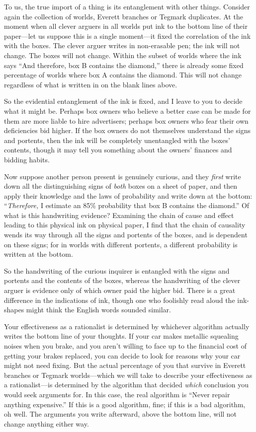 {
 To us, the true import of a thing is its entanglement with other
things. Consider again the collection of worlds, Everett branches or
Tegmark duplicates. At the moment when all clever arguers in all worlds
put ink to the bottom line of their paper---let us suppose this is a
single moment---it fixed the correlation of the ink with the boxes. The
clever arguer writes in non-erasable pen; the ink will not change. The
boxes will not change. Within the subset of worlds where the ink says
``And therefore, box B contains the
diamond,'' there is already some fixed percentage of
worlds where box A contains the diamond. This will not change
regardless of what is written in on the blank lines above.}

{
 So the evidential entanglement of the ink is fixed, and I leave to
you to decide what it might be. Perhaps box owners who believe a better
case can be made for them are more liable to hire advertisers; perhaps
box owners who fear their own deficiencies bid higher. If the box
owners do not themselves understand the signs and portents, then the
ink will be completely unentangled with the boxes'
contents, though it may tell you something about the
owners' finances and bidding habits.}

{
 Now suppose another person present is genuinely curious, and they
\textit{first} write down all the distinguishing signs of \textit{both}
boxes on a sheet of paper, and then apply their knowledge and the laws
of probability and write down at the bottom:
``\textit{Therefore,} I estimate an 85\% probability
that box B contains the diamond.'' Of what is this
handwriting evidence? Examining the chain of cause and effect leading
to this physical ink on physical paper, I find that the chain of
causality wends its way through all the signs and portents of the
boxes, and is dependent on these signs; for in worlds with different
portents, a different probability is written at the bottom.}

{
 So the handwriting of the curious inquirer is entangled with the
signs and portents and the contents of the boxes, whereas the
handwriting of the clever arguer is evidence only of which owner paid
the higher bid. There is a great difference in the indications of ink,
though one who foolishly read aloud the ink-shapes might think the
English words sounded similar.}

{
 Your effectiveness as a rationalist is determined by whichever
algorithm actually writes the bottom line of your thoughts. If your car
makes metallic squealing noises when you brake, and you
aren't willing to face up to the financial cost of
getting your brakes replaced, you can decide to look for reasons why
your car might not need fixing. But the actual percentage of you that
survive in Everett branches or Tegmark worlds---which we will take to
describe your effectiveness as a rationalist---is determined by the
algorithm that decided \textit{which} conclusion you would seek
arguments for. In this case, the real algorithm is
``Never repair anything expensive.''
If this is a good algorithm, fine; if this is a bad algorithm, oh well.
The arguments you write afterward, above the bottom line, will not
change anything either way.}

